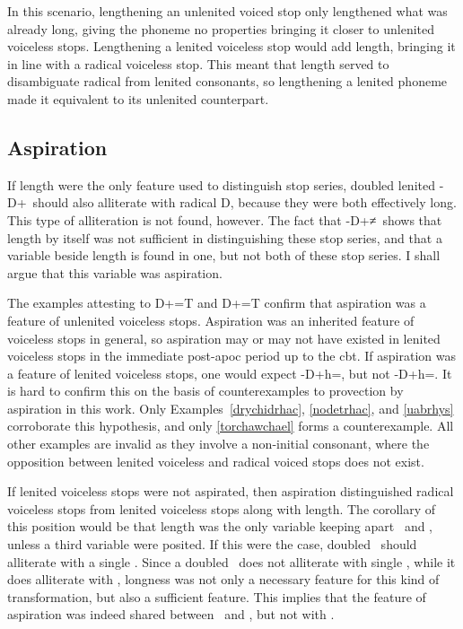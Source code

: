In this scenario, lengthening an unlenited voiced stop only lengthened what was already long, giving the phoneme no properties bringing it closer to unlenited voiceless stops. Lengthening a lenited voiceless stop would add length, bringing it in line with a radical voiceless stop. This meant that length served to disambiguate radical from lenited consonants, so lengthening a lenited phoneme made it equivalent to its unlenited counterpart.

\subsection{Aspiration}
\label{sec:aspiration}
If length were the only feature used to distinguish stop series, doubled lenited -\gls{D}+\lT\ should also alliterate with radical \gls{D}, because they were both effectively long. This type of alliteration is not found, however.  The fact that -\gls{D}+\lT≠\xD\ shows that length by itself was not sufficient in distinguishing these stop series, and that a variable beside length is found in one, but not both of these stop series. I shall argue that this variable was aspiration.

The examples attesting to \gls{D}+=\gls{T} and \gls{D}+=\gls{T} confirm that aspiration was a feature of unlenited voiceless stops. Aspiration was an inherited feature of voiceless stops in general, so aspiration may or may not have existed in lenited voiceless stops in the immediate post-\gls{apoc} period up to the \gls{cbt}. If aspiration was a feature of lenited voiceless stops, one would expect -\gls{D}+h=\lT, but not -\gls{D}+h=\xD. It is hard to confirm this on the basis of counterexamples to provection by aspiration in this work. Only Examples~\ref{drychidrhac}, \ref{nodetrhac}, and \ref{uabrhys} corroborate this hypothesis, and only \ref{torchawchael} forms a counterexample. All other examples are invalid as they involve a non-initial consonant, where the opposition between lenited voiceless and radical voiced stops does not exist. 

If lenited voiceless stops were not aspirated, then aspiration distinguished radical voiceless stops from lenited voiceless stops along with length. The corollary of this position would be that length was the only variable keeping apart \lT\ and \xD, unless a third variable were posited. If this were the case, doubled \lT\ should alliterate with a single \xD. Since a doubled \lT\ does not alliterate with single \xD, while it does alliterate with \xT, longness was not only a necessary feature for this kind of transformation, but also a  sufficient feature. This implies that the feature of aspiration was indeed shared between \lT\ and \xT, but not with \xD.

